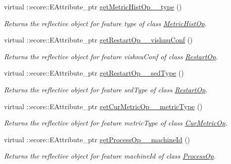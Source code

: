 \begin{DoxyCompactItemize}
virtual ::ecore::EAttribute\_\-ptr \hyperlink{classIMS__Data_1_1IMS__DataPackage_a02fd8b4d1160439096dd32b8067914da}{getMetricHistOp\_\-\_\-type} ()
\begin{DoxyCompactList}\small\item\em Returns the reflective object for feature type of class \hyperlink{classIMS__Data_1_1MetricHistOp}{MetricHistOp}. \item\end{DoxyCompactList}\item 
virtual ::ecore::EAttribute\_\-ptr \hyperlink{classIMS__Data_1_1IMS__DataPackage_ae8c4e0baf23cc3d64dbcddfe2c109ea2}{getRestartOp\_\-\_\-vishnuConf} ()
\begin{DoxyCompactList}\small\item\em Returns the reflective object for feature vishnuConf of class \hyperlink{classIMS__Data_1_1RestartOp}{RestartOp}. \item\end{DoxyCompactList}\item 
virtual ::ecore::EAttribute\_\-ptr \hyperlink{classIMS__Data_1_1IMS__DataPackage_ac4b468bae43607763aff3ffc3fd4b0ef}{getRestartOp\_\-\_\-sedType} ()
\begin{DoxyCompactList}\small\item\em Returns the reflective object for feature sedType of class \hyperlink{classIMS__Data_1_1RestartOp}{RestartOp}. \item\end{DoxyCompactList}\item 
virtual ::ecore::EAttribute\_\-ptr \hyperlink{classIMS__Data_1_1IMS__DataPackage_a867d81314f02d4af0dad7f4b463e36e3}{getCurMetricOp\_\-\_\-metricType} ()
\begin{DoxyCompactList}\small\item\em Returns the reflective object for feature metricType of class \hyperlink{classIMS__Data_1_1CurMetricOp}{CurMetricOp}. \item\end{DoxyCompactList}\item 
virtual ::ecore::EAttribute\_\-ptr \hyperlink{classIMS__Data_1_1IMS__DataPackage_aa13b819cf5a45f11e973786c8b1047a1}{getProcessOp\_\-\_\-machineId} ()
\begin{DoxyCompactList}\small\item\em Returns the reflective object for feature machineId of class \hyperlink{classIMS__Data_1_1ProcessOp}{ProcessOp}. \item\end{DoxyCompactList}\item 

\end{DoxyCompactItemize}
